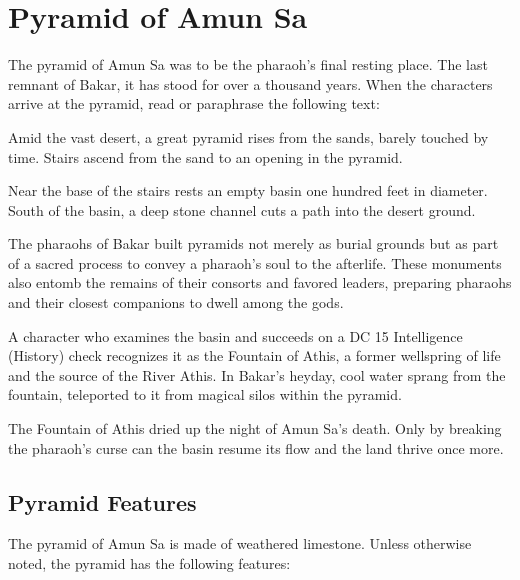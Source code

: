 \documentclass[10pt,a4paper,twoside,bg=print,twocolumn,openany,nodeprecatedcode]{dndbook}
\begin{document}
\section{Pyramid of Amun Sa}
The pyramid of Amun Sa was to be the pharaoh's final resting place. The last remnant of Bakar, it has stood for over a thousand years. When the characters arrive at the pyramid, read or paraphrase the following text:

\begin{DndReadAloud}{}
Amid the vast desert, a great pyramid rises from the sands, barely touched by time. Stairs ascend from the sand to an opening in the pyramid.

Near the base of the stairs rests an empty basin one hundred feet in diameter. South of the basin, a deep stone channel cuts a path into the desert ground.

\end{DndReadAloud}

The pharaohs of Bakar built pyramids not merely as burial grounds but as part of a sacred process to convey a pharaoh's soul to the afterlife. These monuments also entomb the remains of their consorts and favored leaders, preparing pharaohs and their closest companions to dwell among the gods.

A character who examines the basin and succeeds on a DC 15 Intelligence (History) check recognizes it as the Fountain of Athis, a former wellspring of life and the source of the River Athis. In Bakar's heyday, cool water sprang from the fountain, teleported to it from magical silos within the pyramid.

The Fountain of Athis dried up the night of Amun Sa's death. Only by breaking the pharaoh's curse can the basin resume its flow and the land thrive once more.

\subsection{Pyramid Features}
The pyramid of Amun Sa is made of weathered limestone. Unless otherwise noted, the pyramid has the following features:
\end{document}
